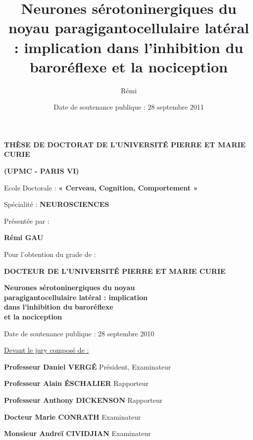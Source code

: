 \documentclass[a4paper,12pt,twoside]{report}
\title{Neurones sérotoninergiques du noyau paragigantocellulaire latéral : implication dans l'inhibition du baroréflexe et la nociception}
\author{Rémi \bsc{GAU}}
\date{Date de soutenance publique : 28 septembre 2011}
\begin{document}
\renewcommand{\labelitemi}{\textbullet~}
\renewcommand{\labelitemii}{\checkmark~}

\pagestyle{empty} %

\begin{center}
\begin{onehalfspacing}
\textbf{THÈSE DE DOCTORAT DE L'UNIVERSITÉ PIERRE ET MARIE CURIE}

\medskip 

\textbf{(UPMC - PARIS VI)}

\medskip

Ecole Doctorale : \textbf{« Cerveau, Cognition, Comportement »}

\medskip

Spécialité : \textbf{NEUROSCIENCES}

\vfill

Présentée par :

\textbf{Rémi GAU}

\vfill

Pour l’obtention du grade de :

\textbf{DOCTEUR DE L'UNIVERSITÉ PIERRE ET MARIE CURIE}

\vfill


\begin{Huge}\textbf{Neurones sérotoninergiques du noyau\\paragigantocellulaire latéral : implication\\ dans l'inhibition du baroréflexe\\ et la nociception\\ }\end{Huge}


\vfill

Date de soutenance publique : 28 septembre 2010

\end{onehalfspacing}
\end{center}

\underline{Devant le jury composé de :}


\textbf{Professeur Daniel VERGÉ} \hfill Président, Examinateur

\textbf{Professeur Alain ÉSCHALIER} \hfill Rapporteur

\textbf{Professeur Anthony DICKENSON} \hfill Rapporteur

\textbf{Docteur Marie CONRATH} \hfill Examinateur

\textbf{Monsieur Andreï CIVIDJIAN} \hfill Examinateur
\end{document}
